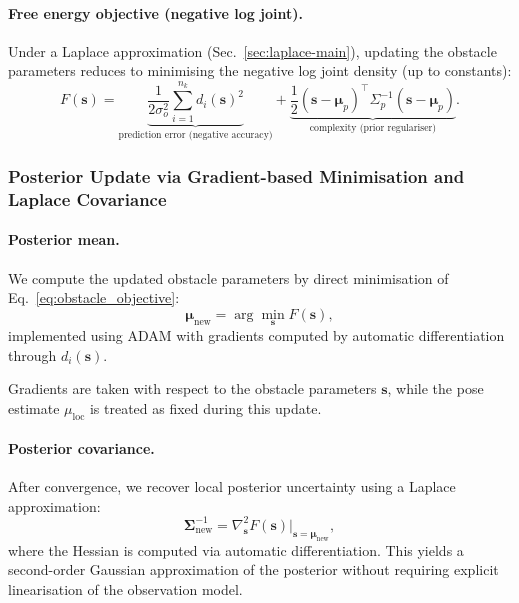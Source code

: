 \documentclass[a4paper, twoside]{article}
\begin{document}
\paragraph{Free energy objective (negative log joint).}
Under a Laplace approximation (Sec.~\ref{sec:laplace-main}), updating the obstacle parameters reduces to minimising
the negative log joint density (up to constants):
\begin{equation}
F(\mathbf{s})
=
\underbrace{\frac{1}{2\sigma_o^2}\sum_{i=1}^{n_k} d_i(\mathbf{s})^2}_{\text{prediction error (negative accuracy)}}
+
\underbrace{\frac{1}{2}(\mathbf{s}-\boldsymbol{\mu}_p)^\top\Sigma_p^{-1}(\mathbf{s}-\boldsymbol{\mu}_p)}_{\text{complexity (prior regulariser)}}.
\label{eq:obstacle_objective}
\end{equation}

\subsubsection{Posterior Update via Gradient-based Minimisation and Laplace Covariance}
\label{sec:obstacle-update}

\paragraph{Posterior mean.}
We compute the updated obstacle parameters by direct minimisation of Eq.~\eqref{eq:obstacle_objective}:
\begin{equation}
\boldsymbol{\mu}_{\text{new}} =
\arg\min_{\mathbf{s}} F(\mathbf{s}),
\end{equation}
implemented using ADAM with gradients computed by automatic differentiation through $d_i(\mathbf{s})$.

Gradients are taken with respect to the obstacle parameters $\mathbf{s}$, while
the pose estimate $\mu_{\text{loc}}$ is treated as fixed during this update.

\paragraph{Posterior covariance.}
After convergence, we recover local posterior uncertainty using a Laplace approximation:
\begin{equation}
\boldsymbol{\Sigma}_{\text{new}}^{-1}
=
\nabla^2_{\mathbf{s}}F(\mathbf{s})\big|_{\mathbf{s}=\boldsymbol{\mu}_{\text{new}}},
\end{equation}
where the Hessian is computed via automatic differentiation.
This yields a second-order Gaussian approximation of the posterior without requiring explicit linearisation
of the observation model.
\end{document}
